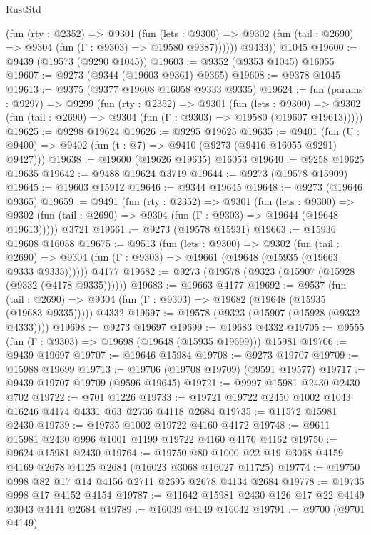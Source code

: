 \begin{lexlean}{RustStd}
\begin{coremodule}
{\begin{coremodule}
{{{{{{{{{{{{{{{{{{{{{{{{{{{{{{{{{{{{{{{{{{{{{{{{{{{{{{{            (fun (rty : @2352) =>
            @9301
              (fun (lets : @9300) =>
              @9302 (fun (tail : @2690) => @9304 (fun (Γ : @9303) => @19580 @9387))))))
        @9433))
    @1045
@19600 := @9439 (@19573 (@9290 @1045))
@19603 := @9352 (@9353 @1045) @16055
@19607 := @9273 (@9344 (@19603 @9361) @9365)
@19608 := @9378 @1045
@19613 := @9375 (@9377 @19608 @16058 @9333 @9335)
@19624 := fun (params : @9297) =>
  @9299
    (fun (rty : @2352) =>
    @9301
      (fun (lets : @9300) =>
      @9302 (fun (tail : @2690) => @9304 (fun (Γ : @9303) => @19580 (@19607 @19613)))))
@19625 := @9298 @19624
@19626 := @9295 @19625
@19635 := @9401
    (fun (U : @9400) => @9402 (fun (t : @7) => @9410 (@9273 (@9416 @16055 @9291) @9427)))
@19638 := @19600 (@19626 @19635) @16053
@19640 := @9258 @19625 @19635
@19642 := @9488 @19624 @3719
@19644 := @9273 (@19578 @15909)
@19645 := @19603 @15912
@19646 := @9344 @19645
@19648 := @9273 (@19646 @9365)
@19659 := @9491
    (fun (rty : @2352) =>
    @9301
      (fun (lets : @9300) =>
      @9302 (fun (tail : @2690) => @9304 (fun (Γ : @9303) => @19644 (@19648 @19613)))))
    @3721
@19661 := @9273 (@19578 @15931)
@19663 := @15936 @19608 @16058
@19675 := @9513
    (fun (lets : @9300) =>
    @9302
      (fun (tail : @2690) =>
      @9304 (fun (Γ : @9303) => @19661 (@19648 (@15935 (@19663 @9333 @9335))))))
    @4177
@19682 := @9273 (@19578 (@9323 (@15907 (@15928 (@9332 (@4178 @9335))))))
@19683 := @19663 @4177
@19692 := @9537
    (fun (tail : @2690) => @9304 (fun (Γ : @9303) => @19682 (@19648 (@15935 (@19683 @9335)))))
    @4332
@19697 := @19578 (@9323 (@15907 (@15928 (@9332 @4333))))
@19698 := @9273 @19697
@19699 := @19683 @4332
@19705 := @9555 (fun (Γ : @9303) => @19698 (@19648 (@15935 @19699))) @15981
@19706 := @9439 @19697
@19707 := @19646 @15984
@19708 := @9273 @19707
@19709 := @15988 @19699
@19713 := @19706 (@19708 @19709) (@9591 @19577)
@19717 := @9439 @19707 @19709 (@9596 @19645)
@19721 := @9997 @15981 @2430 @2430 @702
@19722 := @701 @1226
@19733 := @19721 @19722 @2450 @1002 @1043 @16246 @4174 @4331 @63 @2736 @4118 @2684
@19735 := @11572 @15981 @2430
@19739 := @19735 @1002 @19722 @4160 @4172
@19748 := @9611 @15981 @2430 @996 @1001 @1199 @19722 @4160 @4170 @4162
@19750 := @9624 @15981 @2430
@19764 := @19750 @80 @1000 @22 @19 @3068 @4159 @4169 @2678 @4125 @2684 (@16023 @3068 @16027 @11725)
@19774 := @19750 @998 @82 @17 @14 @4156 @2711 @2695 @2678 @4134 @2684
@19778 := @19735 @998 @17 @4152 @4154
@19787 := @11642 @15981 @2430 @126 @17 @22 @4149 @3043 @4141 @2684
@19789 := @16039 @4149 @16042
@19791 := @9700 (@9701 @4149)
}}}}}}}}}}}}}}}}}}}}}}}}}}}}}}}}}}}}}}}}}}}}}}}}}}}}}}}
\end{coremodule}}
\end{coremodule}
\end{lexlean}
